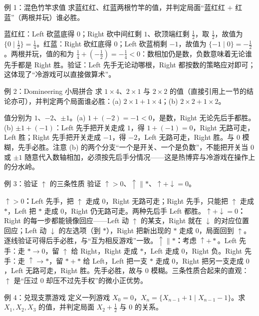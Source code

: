 \begin{problem}{例 1：混色竹竿求值}
求蓝红红、红蓝两根竹竿的值，并判定局面“蓝红红 $+$ 红蓝”（两根并玩）谁必胜。
\end{problem}

\sol 蓝红红：Left 砍蓝底得 $0$；Right 砍中间红剩 $1$、砍顶端红剩 $\tfrac12$，取 $\tfrac12$，故值为 $\{0\mid\tfrac12\}=\tfrac14$。红蓝：Right 砍红底得 $0$；Left 砍蓝梢剩 $-1$，故值为 $\{-1\mid 0\}=-\tfrac12$。两根并玩，值的和为 $\tfrac14+(-\tfrac12)=-\tfrac14<0$：数相加仍是数，负数意味着无论谁先手都是 Right 胜。验证：Left 先手无论动哪根，Right 都按数的策略应对即可；这体现了“冷游戏可以直接做算术”。

\begin{problem}{例 2：Domineering 小局拼合}
求 $1\times4$、$2\times1$ 与 $2\times2$ 的值（直接引用上一节的结论亦可），并判定两个局面谁必胜：(a) $2\times1+1\times4$；(b) $2\times2+1\times2$。
\end{problem}

\sol 值分别为 $1$、$-2$、$\pm1$。(a) $1+(-2)=-1<0$，是数，Right 无论先后手都胜。(b) $\pm1+(-1)$：Left 先手把开关走成 $1$，得 $1+(-1)=0$，Right 无路可走，Left 胜；Right 先手把开关走成 $-1$，得 $-2$，Left 无路可走，Right 胜。与 $0$ 模糊，先手必胜。注意 (b) 的两个分支“一个是开关、一个是负数”，不能把开关当 $0$ 或 $\pm1$ 随意代入数轴相加，必须按先后手分情况——这是热博弈与冷游戏在操作上的分水岭。

\begin{problem}{例 3：验证 $\uparrow$ 的三条性质}
验证 $\uparrow>0$、$\uparrow\parallel\ast$、$\uparrow+\downarrow=0$。
\end{problem}

\sol \textbf{$\uparrow>0$：}Left 先手，把 $\uparrow$ 走成 $0$，Right 无路可走；Right 先手，只能把 $\uparrow$ 走成 $\ast$，Left 把 $\ast$ 走成 $0$，Right 仍无路可走。两种先后手 Left 都胜。\textbf{$\uparrow+\downarrow=0$：}Right 的每一步都能镜像回应——Left 动 $\uparrow$ 的某支，Right 就在 $\downarrow$ 的对应位置回应；Left 动 $\downarrow$ 的左选项（到 $\ast$），Right 把新出现的 $\ast$ 走成 $0$，局面回到 $\uparrow$。逐线验证可得后手必胜，与“互为相反游戏”一致。\textbf{$\uparrow\parallel\ast$：}考虑 $\uparrow+\ast$。Left 先手：走 $\ast\to0$，留 $\uparrow$ 给 Right，Right 走成 $\ast$，Left 走成 $0$，Right 负。Right 先手：走 $\uparrow\to\ast$，留 $\ast+\ast$ 给 Left，Left 把一支 $\ast$ 走成 $0$，Right 把另一支走成 $0$，Left 无路可走，Right 胜。先手必胜，故与 $0$ 模糊。三条性质合起来的直观：$\uparrow$ 是“压过 $0$ 却压不过先手权”的微小正优势。

\begin{problem}{例 4：兑现支票游戏}
定义一列游戏 $X_0=0$，$X_{n}=\{X_{n-1}+1\mid X_{n-1}-1\}$。求 $X_1,X_2,X_3$ 的值，并判定局面 $X_2+\tfrac12$ 与 $0$ 的关系。
\end{problem}

